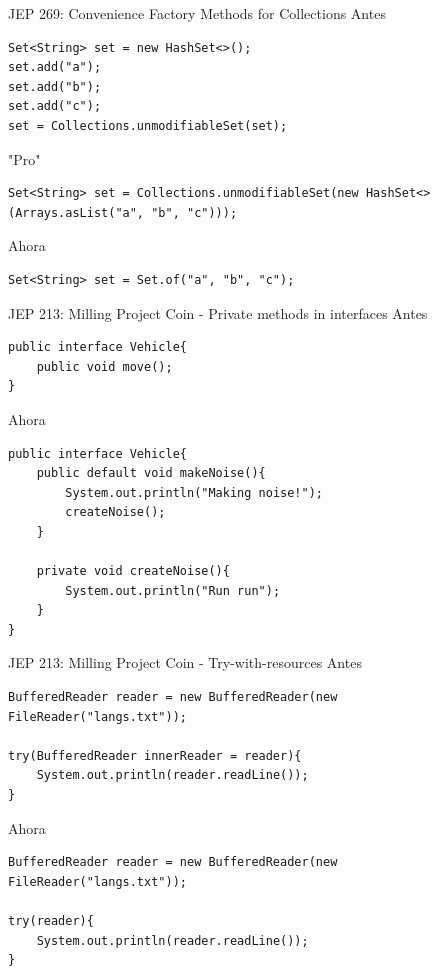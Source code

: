 \documentclass[aspectratio=169]{beamer}
\begin{document}
\begin{frame}[fragile]{JEP 269: Convenience Factory Methods for Collections}
Antes
\begin{lstlisting}
Set<String> set = new HashSet<>();
set.add("a");
set.add("b");
set.add("c");
set = Collections.unmodifiableSet(set);
\end{lstlisting}	

"Pro"
\begin{lstlisting}
Set<String> set = Collections.unmodifiableSet(new HashSet<>(Arrays.asList("a", "b", "c")));
\end{lstlisting}	

Ahora
\begin{lstlisting}
Set<String> set = Set.of("a", "b", "c");
\end{lstlisting}
\end{frame}


\begin{frame}[fragile]{JEP 213: Milling Project Coin - Private methods in interfaces}
Antes
\begin{lstlisting}
public interface Vehicle{
    public void move();
}
\end{lstlisting}	

Ahora
\begin{lstlisting}[basicstyle=\scriptsize\ttfamily]
public interface Vehicle{
    public default void makeNoise(){
        System.out.println("Making noise!");
        createNoise();
    }

    private void createNoise(){
        System.out.println("Run run");
    } 
}
\end{lstlisting}	
    
\end{frame}

\begin{frame}[fragile]{JEP 213: Milling Project Coin - Try-with-resources}
Antes
\begin{lstlisting}
BufferedReader reader = new BufferedReader(new FileReader("langs.txt"));

try(BufferedReader innerReader = reader){
    System.out.println(reader.readLine());
}
\end{lstlisting}	

Ahora
\begin{lstlisting}
BufferedReader reader = new BufferedReader(new FileReader("langs.txt"));

try(reader){
    System.out.println(reader.readLine());
}
\end{lstlisting}	
    
\end{frame}
\end{document}
